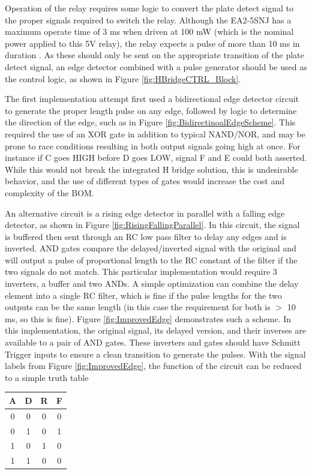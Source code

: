 \documentclass{article}
\begin{document}
		Operation of the relay requires some logic to convert the plate detect signal to the proper signals required to switch the relay.  Although the EA2-5SNJ has a maximum operate time of 3 ms when driven at 100 mW (which is the nominal power applied to this 5V relay), the relay expects a pulse of more than 10 ms in duration \cite{EA2datasheet}.  As these should only be sent on the appropriate transition of the plate detect signal, an edge detector combined with a pulse generator should be used as the control logic, as shown in Figure \ref{fig:HBridgeCTRL_Block}.

		The first implementation attempt first used a bidirectional edge detector circuit to generate the proper length pulse on any edge, followed by logic to determine the direction of the edge, such as in Figure \ref{fig:BidirectinoalEdgeScheme}.  This required the use of an XOR gate in addition to typical NAND/NOR, and may be prone to race conditions resulting in both output signals going high at once.  For instance if C goes HIGH before D goes LOW, signal F and E could both asserted.  While this would not break the integrated H bridge solution, this is undesirable behavior, and the use of different types of gates would increase the cost and complexity of the BOM.

		An alternative circuit is a rising edge detector in parallel with a falling edge detector, as shown in Figure \ref{fig:RisingFallingParallel}.  In this circuit, the signal is buffered then sent through an RC low pass filter to delay any edges and is inverted.  AND gates compare the delayed/inverted signal with the original and will output a pulse of proportional length to the RC constant of the filter if the two signals do not match.  This particular implementation would require 3 inverters, a buffer and two ANDs.  A simple optimization can combine the delay element into a single RC filter, which is fine if the pulse lengths for the two outputs can be the same length (in this case the requirement for both is $>$ 10 ms, so this is fine).  Figure \ref{fig:ImprovedEdge} demonstrates such a scheme.  In this implementation, the original signal, its delayed version, and their inverses are available to a pair of AND gates.  These inverters and gates should have Schmitt Trigger inputs to ensure a clean transition to generate the pulses.  With the signal labels from Figure \ref{fig:ImprovedEdge}, the function of the circuit can be reduced to a simple truth table

		\begin{center}
		\begin{tabular}{c c|c c}
			A & D & R & F \\
			\hline
			0 & 0 & 0 & 0 \\
			0 & 1 & 0 & 1 \\
			1 & 0 & 1 & 0 \\
			1 & 1 & 0 & 0
		\end{tabular}
		\end{center}
\end{document}
